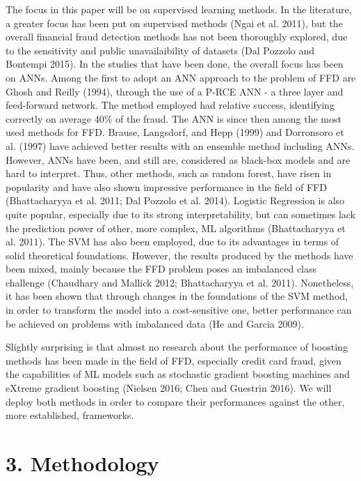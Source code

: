\documentclass[12pt,]{article}
\begin{document}
The focus in this paper will be on supervised learning methods. In the
literature, a greater focus has been put on supervised methods (Ngai et
al. 2011), but the overall financial fraud detection methods has not
been thoroughly explored, due to the sensitivity and public
unavailaibility of datasets (Dal Pozzolo and Bontempi 2015). In the
studies that have been done, the overall focus has been on ANNs. Among
the first to adopt an ANN approach to the problem of FFD are Ghosh and
Reilly (1994), through the use of a P-RCE ANN - a three layer and
feed-forward network. The method employed had relative success,
identifying correctly on average 40\% of the fraud. The ANN is since
then among the most used methods for FFD. Brause, Langsdorf, and Hepp
(1999) and Dorronsoro et al. (1997) have achieved better results with an
ensemble method including ANNs. However, ANNs have been, and still are,
considered as black-box models and are hard to interpret. Thus, other
methods, such as random forest, have risen in popularity and have also
shown impressive performance in the field of FFD (Bhattacharyya et al.
2011; Dal Pozzolo et al. 2014). Logistic Regression is also quite
popular, especially due to its strong interpretability, but can
sometimes lack the prediction power of other, more complex, ML
algorithms (Bhattacharyya et al. 2011). The SVM has also been employed,
due to its advantages in terms of solid theoretical foundations.
However, the results produced by the methods have been mixed, mainly
because the FFD problem poses an imbalanced class challenge (Chaudhary
and Mallick 2012; Bhattacharyya et al. 2011). Nonetheless, it has been
shown that through changes in the foundations of the SVM method, in
order to transform the model into a cost-sensitive one, better
performance can be achieved on problems with imbalanced data (He and
Garcia 2009).

Slightly surprising is that almost no research about the performance of
boosting methods has been made in the field of FFD, especially credit
card fraud, given the capabilities of ML models such as stochastic
gradient boosting machines and eXtreme gradient boosting (Nielsen 2016;
Chen and Guestrin 2016). We will deploy both methods in order to compare
their performances against the other, more established, frameworks.

\hypertarget{methodology}{%
\section{3. Methodology}\label{methodology}}
\end{document}
